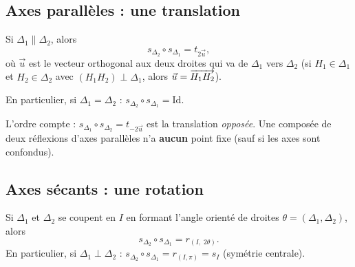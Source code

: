 \subsection{Axes parallèles : une translation}

\begin{theoreme}
	Si $\Delta_1\parallel\Delta_2$, alors
	$$
	s_{\Delta_2}\circ s_{\Delta_1} = t_{2\vec u},
	$$
	où $\vec u$ est le vecteur orthogonal aux deux droites qui va de
	$\Delta_1$ vers $\Delta_2$ (si $H_1\in\Delta_1$ et $H_2\in\Delta_2$ avec
	$(H_1H_2)\perp\Delta_1$, alors $\vec u=\overrightarrow{H_1H_2}$).

	En particulier, si $\Delta_1=\Delta_2$ : $s_{\Delta_2}\circ s_{\Delta_1}=\mathrm{Id}$.
\end{theoreme}

\begin{center}
\end{center}

\begin{attention}
	L'ordre compte : $s_{\Delta_1}\circ s_{\Delta_2}=t_{-2\vec u}$ est la
	translation \emph{opposée}. Une composée de deux réflexions d'axes
	parallèles n'a \textbf{aucun} point fixe (sauf si les axes sont confondus).
\end{attention}

\subsection{Axes sécants : une rotation}

\begin{theoreme}
	Si $\Delta_1$ et $\Delta_2$ se coupent en $I$ en formant l'angle orienté de
	droites $\theta=(\Delta_1,\Delta_2)$, alors
	$$
	s_{\Delta_2}\circ s_{\Delta_1} = r_{(I,\;2\theta)}.
	$$
	En particulier, si $\Delta_1\perp\Delta_2$ :
	$s_{\Delta_2}\circ s_{\Delta_1}=r_{(I,\pi)}=s_I$ (symétrie centrale).
\end{theoreme}

